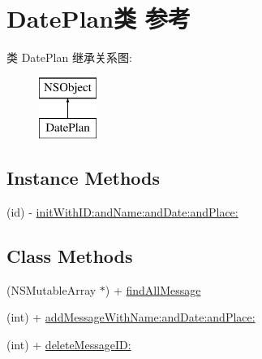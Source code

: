 \hypertarget{interface_date_plan}{\section{Date\-Plan类 参考}
\label{interface_date_plan}
}
类 Date\-Plan 继承关系图\-:\begin{figure}[H]
\begin{center}
\leavevmode
\includegraphics[height=2.000000cm]{interface_date_plan}
\end{center}
\end{figure}
\subsection*{Instance Methods}
\begin{DoxyCompactItemize}
\item 
(id) -\/ \hyperlink{interface_date_plan_a44ceee79778f8ce6f91903beba84d6f1}{init\-With\-I\-D\-:and\-Name\-:and\-Date\-:and\-Place\-:}
\end{DoxyCompactItemize}
\subsection*{Class Methods}
\begin{DoxyCompactItemize}
\item 
(N\-S\-Mutable\-Array $\ast$) + \hyperlink{interface_date_plan_a1626f9373dd50829d4b36597963962b3}{find\-All\-Message}
\item 
(int) + \hyperlink{interface_date_plan_a75da4a0db59e63008afeb52b09412578}{add\-Message\-With\-Name\-:and\-Date\-:and\-Place\-:}
\item 
(int) + \hyperlink{interface_date_plan_a7d17c19b22b1b9903cd77d4fc9555c79}{delete\-Message\-I\-D\-:}
\end{DoxyCompactItemize}
